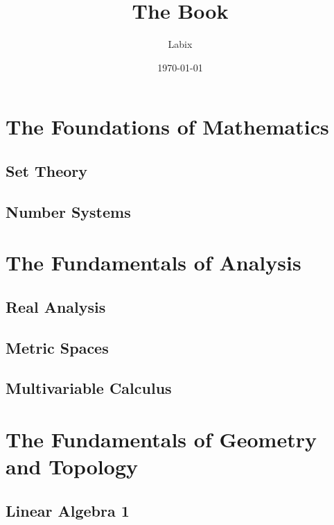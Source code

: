 \documentclass[a4paper]{report}
\title{The Book}
\author{Labix}
\date{\today}
\begin{document}
\maketitle
\begin{abstract}
\end{abstract}
\pagebreak
\tableofcontents
\pagebreak
\part{The Foundations of Mathematics}
\chapter{Set Theory}


\chapter{Number Systems}


\part{The Fundamentals of Analysis}
\chapter{Real Analysis}


\chapter{Metric Spaces}


\chapter{Multivariable Calculus}


\part{The Fundamentals of Geometry and Topology}
\chapter{Linear Algebra 1}

\end{document}

